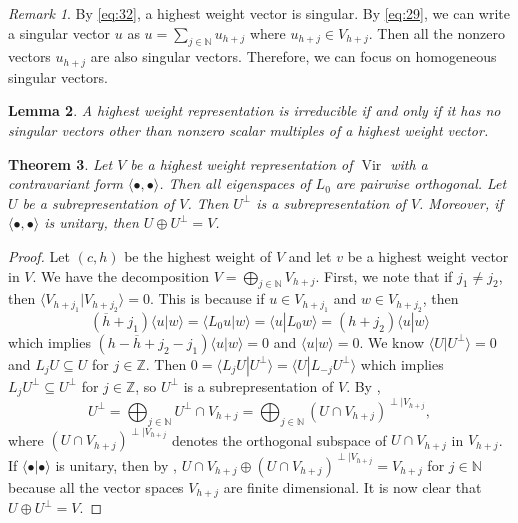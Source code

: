 \documentclass[a4paper, 12pt, reqno]{amsart}
\newtheorem{theorem}{Theorem}[subsection]
\newtheorem{lemma}[theorem]{Lemma}
\theoremstyle{remark}
\newtheorem{remark}[theorem]{Remark}
\numberwithin{equation}{subsection}
\DeclareMathOperator{\Vir}{Vir}
\begin{document}
\begin{remark}
  \label{rmk:22}
  By \eqref{eq:32}, a highest weight vector is singular. 
  By \eqref{eq:29}, we can  write a singular vector $u$ as $u = \sum_{j \in \mathbb{N}}u_{h + j}$ where $u_{h + j} \in V_{h + j}$.
  Then all the nonzero vectors $u_{h + j}$ are also singular vectors.
  Therefore, we can focus on homogeneous singular vectors.
\end{remark}

\begin{lemma}
  \label{lmm:16}
  A highest weight representation is irreducible if and only if it has no singular vectors other than nonzero scalar multiples of a highest weight vector.
\end{lemma}

\begin{theorem}
  \label{thr:25}
  Let $V$ be a highest weight representation of $\Vir$ with a contravariant form $\langle \bullet, \bullet\rangle$.
  Then all eigenspaces of $L_0$ are pairwise orthogonal.
  Let $U$ be a subrepresentation of $V$.
  Then $U^\perp$ is a subrepresentation of $V$.
  Moreover, if $\langle \bullet, \bullet\rangle$ is unitary, then $U\oplus U^\perp=V$.
\end{theorem}

\begin{proof}
  Let $(c, h)$ be the highest weight of $V$ and let $v$ be a highest weight vector in $V$.
  We have the decomposition $V = \bigoplus_{j \in \mathbb{N}}V_{h + j}$.
  First, we note that if $j_1 \neq j_2$, then $\langle V_{h + j_1}| V_{h + j_2}\rangle = 0$.
  This is because if $u \in V_{h + j_1}$ and $w \in V_{h + j_2}$, then
  \begin{equation*}
    (\overline{h} + j_1)\langle u| w\rangle = \langle L_0u| w\rangle = \langle u| L_0w\rangle = (h + j_2)\langle u| w\rangle
  \end{equation*}
  which implies $(h - \overline{h} + j_2 - j_1)\langle u| w\rangle = 0$ and $\langle u| w\rangle = 0$.
  We know $\langle U| U^{\perp}\rangle = 0$ and $L_jU \subseteq U$ for $j \in \mathbb{Z}$.
  Then $0 = \langle L_jU| U^{\perp}\rangle = \langle U| L_{-j}U^{\perp}\rangle$ which implies $L_jU^{\perp} \subseteq U^{\perp}$ for $j \in \mathbb{Z}$, so $U^{\perp}$ is a subrepresentation of $V$.
  By ,
  \begin{equation*}
     U^{\perp} = \bigoplus_{j \in \mathbb{N}}U^{\perp} \cap V_{h + j} = \bigoplus_{j \in \mathbb{N}}(U \cap V_{h + j})^{\perp|V_{h + j}},
  \end{equation*}
  where $(U \cap V_{h + j})^{\perp|V_{h + j}}$ denotes the orthogonal subspace of $U \cap V_{h + j}$ in $V_{h + j}$.
  If $\langle \bullet| \bullet\rangle$ is unitary, then by , $U \cap V_{h + j} \oplus (U \cap V_{h + j})^{\perp|V_{h + j}} = V_{h + j}$ for $j \in \mathbb{N}$ because all the vector spaces $V_{h + j}$ are finite dimensional.
  It is now clear that $U \oplus U^{\perp} = V$.
\end{proof}
\end{document}
